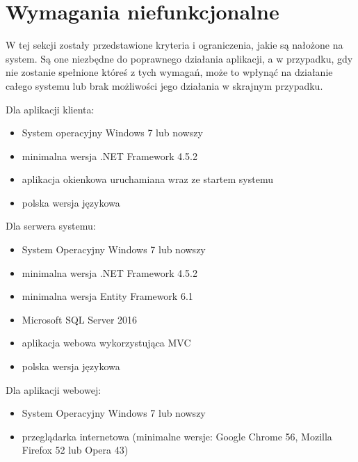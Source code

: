 \section{Wymagania niefunkcjonalne}
W tej sekcji zostały przedstawione kryteria i ograniczenia, jakie są nałożone na system. Są one niezbędne do poprawnego działania aplikacji, a w przypadku, gdy nie zostanie spełnione któreś z tych wymagań, może to wpłynąć na działanie całego systemu lub brak możliwości jego działania w skrajnym przypadku.

\vspace{1.0cm}

Dla aplikacji klienta:
\begin{itemize}
    \item System operacyjny Windows 7 lub nowszy
    \item minimalna wersja .NET Framework 4.5.2
    \item aplikacja okienkowa uruchamiana wraz ze startem systemu
    \item polska wersja językowa
\end{itemize}

\vspace{0.5cm}

Dla serwera systemu:
\begin{itemize}
    \item System Operacyjny Windows 7 lub nowszy
    \item minimalna wersja .NET Framework 4.5.2
    \item minimalna wersja Entity Framework 6.1
    \item Microsoft SQL Server 2016
    \item aplikacja webowa wykorzystująca MVC
    \item polska wersja językowa
\end{itemize}

\vspace{0.5cm}

Dla aplikacji webowej:
\begin{itemize}
    \item System Operacyjny Windows 7 lub nowszy
    \item przeglądarka internetowa (minimalne wersje: Google Chrome 56, Mozilla Firefox 52 lub Opera 43)
\end{itemize}